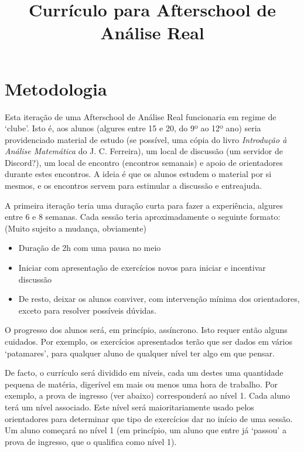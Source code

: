\documentclass{article}
\title{Currículo para Afterschool de Análise Real}
\author{}
\date{}
\begin{document}
	\maketitle
	
	\section{Metodologia}
	
	Esta iteração de uma Afterschool de Análise Real funcionaria em regime de `clube'. Isto é, aos alunos (algures entre 15 e 20, do 9º ao 12º ano) seria providenciado material de estudo (se possível, uma cópia do livro \emph{Introdução à Análise Matemática} do J. C. Ferreira), um local de discussão (um servidor de Discord?), um local de encontro (encontros semanais) e apoio de orientadores durante estes encontros. A ideia é que os alunos estudem o material por si mesmos, e os encontros servem para estimular a discussão e entreajuda.
	
	A primeira iteração teria uma duração curta para fazer a experiência, algures entre 6 e 8 semanas. Cada sessão teria aproximadamente o seguinte formato: (Muito sujeito a mudança, obviamente)
	
	\begin{itemize}
	\item Duração de 2h com uma pausa no meio
	
	\item Iniciar com apresentação de exercícios novos para iniciar e incentivar discussão
	
	\item De resto, deixar os alunos conviver, com intervenção mínima dos orientadores, exceto para resolver possíveis dúvidas.
	\end{itemize}
	
	O progresso dos alunos será, em princípio, assíncrono. Isto requer então alguns cuidados. Por exemplo, os exercícios apresentados terão que ser dados em vários `patamares', para qualquer aluno de qualquer nível ter algo em que pensar.
	
	De facto, o currículo será dividido em níveis, cada um destes uma quantidade pequena de matéria, digerível em mais ou menos uma hora de trabalho. Por exemplo, a prova de ingresso (ver abaixo) corresponderá ao nível 1. Cada aluno terá um nível associado. Este nível será maioritariamente usado pelos orientadores para determinar que tipo de exercícios dar no início de uma sessão. Um aluno começará no nível 1 (em princípio, um aluno que entre já `passou' a prova de ingresso, que o qualifica como nível 1).
	
\end{document}
